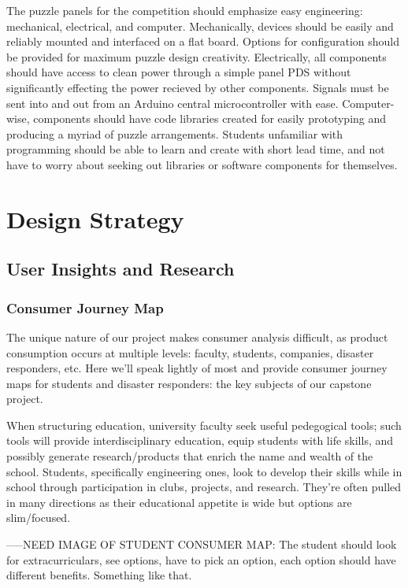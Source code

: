 \documentclass[a4paper, 10pt]{article}
\begin{document}
	The puzzle panels for the competition should emphasize easy engineering: mechanical, electrical, and computer. Mechanically, devices should be easily and reliably mounted and interfaced on a flat board. Options for configuration should be provided for maximum puzzle design creativity. Electrically, all components should have access to clean power through a simple panel PDS without significantly effecting the power recieved by other components. Signals must be sent into and out from an Arduino central microcontroller with ease. Computer-wise, components should have code libraries created for easily prototyping and producing a myriad of puzzle arrangements. Students unfamiliar with programming should be able to learn and create with short lead time, and not have to worry about seeking out libraries or software components for themselves. 
	
\pagebreak

\section{Design Strategy}
	\subsection{User Insights and Research} 
		\subsubsection{Consumer Journey Map}
		The unique nature of our project makes consumer analysis difficult, as product consumption occurs at multiple levels: faculty, students, companies, disaster responders, etc. Here we'll speak lightly of most and provide consumer journey maps for students and disaster responders: the key subjects of our capstone project.
		
		When structuring education, university faculty seek useful pedegogical tools; such tools will provide  interdisciplinary education, equip students with life skills, and possibly generate research/products that enrich the name and wealth of the school. Students, specifically engineering ones, look to develop their skills while in school through participation in clubs, projects, and research. They're often pulled in many directions as their educational appetite is wide but options are slim/focused.
		
		-----NEED IMAGE OF STUDENT CONSUMER MAP: The student should look for extracurriculars, see options, have to pick an option, each option should have different benefits. Something like that.
		
\end{document}
